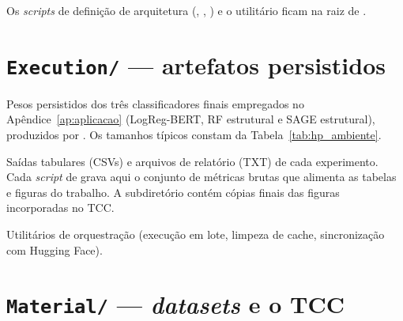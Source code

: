 Os \emph{scripts} de defini\c{c}\~ao de arquitetura
(, , )
e o utilit\'ario  ficam na raiz de
.

\section{\texttt{Execution/} --- artefatos persistidos}
\label{sec:ap_execution}

\begin{description}\setlength{\itemsep}{2pt}
\item[\texttt{Execution/weights/}] Pesos persistidos dos tr\^es
classificadores finais empregados no Ap\^endice~\ref{ap:aplicacao}
(LogReg-BERT, RF estrutural e SAGE estrutural), produzidos por
. Os tamanhos t\'ipicos
constam da Tabela~\ref{tab:hp_ambiente}.

\item[\texttt{Execution/results/}] Sa\'idas tabulares (CSVs) e arquivos
de relat\'orio (TXT) de cada experimento. Cada \emph{script} de
 grava aqui o conjunto de m\'etricas
brutas que alimenta as tabelas e figuras do trabalho. A
 subdiret\'orio cont\'em c\'opias finais das
figuras incorporadas no TCC.

\item[\texttt{Execution/scripts/}] Utilit\'arios de orquestra\c{c}\~ao
(execu\c{c}\~ao em lote, limpeza de cache, sincroniza\c{c}\~ao com
Hugging Face).
\end{description}

\section{\texttt{Material/} --- \emph{datasets} e o TCC}
\label{sec:ap_material}

